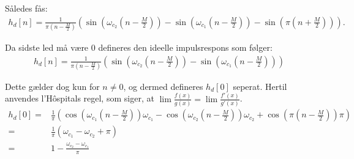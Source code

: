 Således fås:
\begin{align*}
h_d[n]= \frac{1}{\pi \left(n-\frac{M}{2}\right)} \left(\sin\left(\omega_{c_2} \left(n-\frac{M}{2}\right)\right) - \sin\left(\omega_{c_1} \left(n-\frac{M}{2}\right)\right) - \sin\left( \pi\left( n + \frac{M}{2} \right) \right) \right).
\end{align*}

Da sidste led må være $0$ defineres den ideelle impulsrespons som følger:
\begin{align*}
h_d[n]= \frac{1}{\pi \left(n-\frac{M}{2}\right)} \left(\sin\left(\omega_{c_2} \left(n-\frac{M}{2}\right)\right) - \sin\left(\omega_{c_1} \left(n-\frac{M}{2}\right)\right)\right)
\end{align*}

Dette gælder dog kun for $n \neq 0$, og dermed defineres $h_d[0]$ seperat. Hertil anvendes l'Hôspitals regel, som siger, at $\lim \frac{f(x)}{g(x)}=\lim \frac{f'(x)}{g'(x)}$.
\begin{align*}
h_d[0]=& \frac{1}{\pi} \left( \cos\left( \omega_{c_1} \left(n-\frac{M}{2}\right) \right)\omega_{c_1} - \cos\left( \omega_{c_2} \left(n-\frac{M}{2}\right) \right)\omega_{c_2} +  \cos\left(\pi \left( n- \frac{M}{2}\right) \right) \pi \right) \\
=& \frac{1}{\pi}\left( \omega_{c_1} - \omega_{c_2} + \pi \right) \\
=& 1 - \frac{\omega_{c_2}-\omega_{c_1}}{\pi}
\end{align*}
 
 